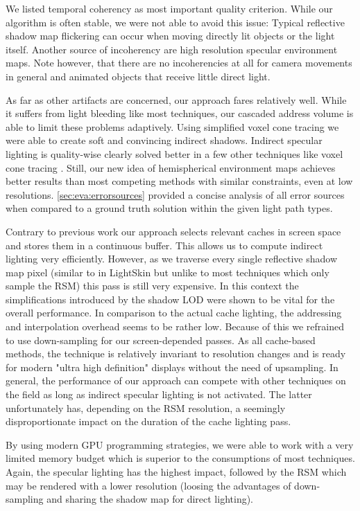 \documentclass[thesis.tex]{subfiles}
\begin{document}
We listed temporal coherency as most important quality criterion.
While our algorithm is often stable, we were not able to avoid this issue:
Typical reflective shadow map flickering can occur when moving directly lit objects or the light itself.
Another source of incoherency are high resolution specular environment maps.
Note however, that there are no incoherencies at all for camera movements in general and animated objects that receive little direct light.

As far as other artifacts are concerned, our approach fares relatively well.
While it suffers from light bleeding like most techniques, our cascaded address volume is able to limit these problems adaptively.
Using simplified voxel cone tracing we were able to create soft and convincing indirect shadows.
Indirect specular lighting is quality-wise clearly solved better in a few other techniques like voxel cone tracing \cite{bib:voxelconetracing}.
Still, our new idea of hemispherical environment maps achieves better results than most competing methods with similar constraints, even at low resolutions.
\autoref{sec:eva:errorsources} provided a concise analysis of all error sources when compared to a ground truth solution within the given light path types.

Contrary to previous work our approach selects relevant caches in screen space and stores them in a continuous buffer.
This allows us to compute indirect lighting very efficiently.
However, as we traverse every single reflective shadow map pixel (similar to in LightSkin \cite{bib:LightskinPaper} but unlike to most techniques which only sample the RSM) this pass is still very expensive.
In this context the simplifications introduced by the shadow LOD were shown to be vital for the overall performance.
In comparison to the actual cache lighting, the addressing and interpolation overhead seems to be rather low.
Because of this we refrained to use down-sampling for our screen-depended passes.
As all cache-based methods, the technique is relatively invariant to resolution changes and is ready for modern "ultra  high definition" displays without the need of upsampling.
In general, the performance of our approach can compete with other techniques on the field as long as indirect specular lighting is not activated.
The latter unfortunately has, depending on the RSM resolution, a seemingly disproportionate impact on the duration of the cache lighting pass.

By using modern GPU programming strategies, we were able to work with a very limited memory budget which is superior to the consumptions of most techniques.
Again, the specular lighting has the highest impact, followed by the RSM which may be rendered with a lower resolution (loosing the advantages of down-sampling and sharing the shadow map for direct lighting).
\end{document}
